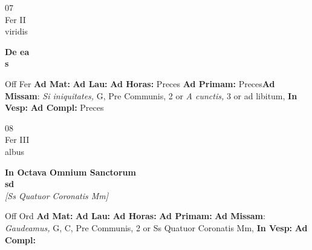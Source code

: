\documentclass[10pt, openany]{book}
\begin{document}
    \begin{center}
        \begin{minipage}{3.5in}
            \vspace{2em}
            \begin{minipage}{0.5in}
                {\Huge 07} \\
                {\normalsize Fer II} \\
                {\normalsize viridis}
            \end{minipage}
            \begin{minipage}{3.0in}
                \textbf{ \large De ea \\
                \textnormal{\normalsize s}} \\ 
            \end{minipage}
            \begin{justify}Off Fer
                \textbf{Ad Mat: }
                \textbf{Ad Lau: }
                \textbf{Ad Horas: }Preces
                \textbf{Ad Primam: }Preces\textbf{Ad Missam}: \textit{Si iniquitates,} G, Pre Communis, 2 or \textit{A cunctis,} 3 or ad libitum,  
                \textbf{In Vesp: }
                \textbf{Ad Compl: }Preces
            \end{justify}
        \end{minipage}
    \end{center}

    \begin{center}
        \begin{minipage}{3.5in}
            \vspace{2em}
            \begin{minipage}{0.5in}
                {\Huge 08} \\
                {\normalsize Fer III} \\
                {\normalsize albus}
            \end{minipage}
            \begin{minipage}{3.0in}
                \textbf{ \large In Octava Omnium Sanctorum \\
                \textnormal{\normalsize sd}} \\ \textit{[Ss Quatuor Coronatis Mm]} \\ 
            \end{minipage}
            \begin{justify}Off Ord
                \textbf{Ad Mat: }
                \textbf{Ad Lau: }
                \textbf{Ad Horas: }
                \textbf{Ad Primam: }\textbf{Ad Missam}: \textit{Gaudeamus,} G, C, Pre Communis, 2 or Ss Quatuor Coronatis Mm,  
                \textbf{In Vesp: }
                \textbf{Ad Compl: }
            \end{justify}
        \end{minipage}
    \end{center}
\end{document}
